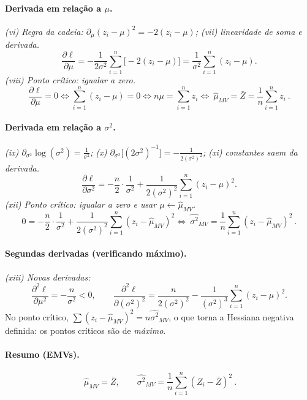 \paragraph{Derivada em relação a $\mu$.}
\emph{(vi) Regra da cadeia: $\partial_\mu(z_i-\mu)^2=-2(z_i-\mu)$; 
(vii) linearidade de soma e derivada.}
\[
\frac{\partial\ell}{\partial\mu}
=-\frac{1}{2\sigma^2}\sum_{i=1}^n\big[-2(z_i-\mu)\big]
=\frac{1}{\sigma^2}\sum_{i=1}^n (z_i-\mu).
\]
\emph{(viii) Ponto crítico: igualar a zero.}
\[
\frac{\partial\ell}{\partial\mu}=0
\iff \sum_{i=1}^n (z_i-\mu)=0
\iff n\mu=\sum_{i=1}^n z_i
\iff \boxed{\ \widehat\mu_{MV}=\bar Z=\frac{1}{n}\sum_{i=1}^n z_i\ }.
\]

\paragraph{Derivada em relação a $\sigma^2$.}
\emph{(ix) $\partial_{\sigma^2}\log(\sigma^2)=\frac{1}{\sigma^2}$; 
(x) $\partial_{\sigma^2}\big[(2\sigma^2)^{-1}\big]=-\frac{1}{2(\sigma^2)^2}$; 
(xi) constantes saem da derivada.}
\[
\frac{\partial\ell}{\partial\sigma^2}
=-\frac{n}{2}\cdot\frac{1}{\sigma^2}
+\frac{1}{2(\sigma^2)^2}\sum_{i=1}^n (z_i-\mu)^2 .
\]
\emph{(xii) Ponto crítico: igualar a zero e usar $\mu\leftarrow\widehat\mu_{MV}$.}
\[
0=-\frac{n}{2}\cdot\frac{1}{\sigma^2}
+\frac{1}{2(\sigma^2)^2}\sum_{i=1}^n (z_i-\widehat\mu_{MV})^2
\iff
\boxed{\ \widehat{\sigma^2}_{MV}=\frac{1}{n}\sum_{i=1}^n (z_i-\widehat\mu_{MV})^2\ }.
\]

\paragraph{Segundas derivadas (verificando máximo).}
\emph{(xiii) Novas derivadas:}
\[
\frac{\partial^2\ell}{\partial\mu^2}=-\frac{n}{\sigma^2}<0,\qquad
\frac{\partial^2\ell}{\partial(\sigma^2)^2}
=\frac{n}{2(\sigma^2)^2}-\frac{1}{(\sigma^2)^3}\sum_{i=1}^n (z_i-\mu)^2.
\]
No ponto crítico, $\sum (z_i-\widehat\mu_{MV})^2=n\widehat{\sigma^2}_{MV}$,
o que torna a Hessiana negativa definida: os pontos críticos são de \emph{máximo}.

\paragraph{Resumo (EMVs).}
\[
\boxed{\ \widehat\mu_{MV}=\bar Z,\qquad
\widehat{\sigma^2}_{MV}=\frac{1}{n}\sum_{i=1}^n (Z_i-\bar Z)^2\ }.
\]

